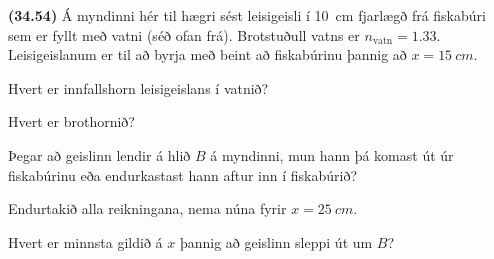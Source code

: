 \begin{enumerate}[label = \textbf{(\alph*)}]
\begin{minipage}{\linewidth}
\begin{minipage}{\linewidth}
\item[\textbf{(34.54)}] Á myndinni hér til hægri sést leisigeisli í \SI{10}{cm} fjarlægð frá fiskabúri sem er fyllt með vatni (séð ofan frá). Brotstuðull vatns er $n_{\text{vatn}} = \num{1.33}$. Leisigeislanum er til að byrja með beint að fiskabúrinu þannig að $x = \SI{15}{cm}$.  \begin{enumerate*}[label = \textbf{(\alph*)}]
    \item Hvert er innfallshorn leisigeislans í vatnið?
    \item Hvert er brothornið?
    \item Þegar að geislinn lendir á hlið $B$ á myndinni, mun hann þá komast út úr fiskabúrinu eða endurkastast hann aftur inn í fiskabúrið?
    \item Endurtakið alla reikningana, nema núna fyrir $x = \SI{25}{cm}$.
    \item Hvert er minnsta gildið á $x$ þannig að geislinn sleppi út um $B$?
\end{enumerate*}

\end{minipage}

\end{minipage}


\end{enumerate}
